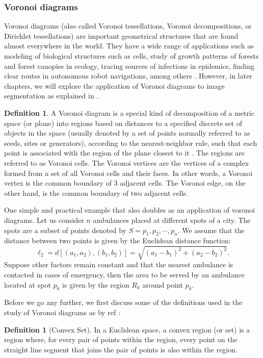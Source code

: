 \documentclass[10pt,a4paper]{article}
\theoremstyle{plain}
\theoremstyle{definition}
\newtheorem{defn}[subsection]{Definition}
\begin{document}
     \subsubsection{Voronoi diagrams }  
     Voronoi diagrams (also called Voronoi tessellations, Voronoi
     decompositions, or Dirichlet tessellations) are important geometrical structures that are found almost everywhere in the world. They have a wide range of applications such as modeling of biological structures such as cells, study of growth patterns of forests and forest canopies in ecology, tracing sources of infections in epidemics, finding clear routes in autonomous robot navigations, among others \citep{okabe2009spatial}. However, in later chapters, we will explore the application of Voronoi diagrams to image segmentation as explained in \citep{stoica2011delaunay}.\\
     \begin{defn}
     	A Voronoi diagram is a special kind of decomposition of a metric space (or plane) into regions based on distances to a specified discrete set of objects in the space (usually denoted by a
     	set of points normally referred to as seeds, sites or generators), according to the nearest-neighbor rule, such that each point is associated with the region of the plane closest to it \citep{aurenhammer2000voronoi}. The regions are referred to as Voronoi cells. The Voronoi vertices are the vertices of a complex formed from a set of all Voronoi cells and their faces. In other words, a Voronoi vertex is the common boundary of 3 adjacent cells. The Voronoi edge, on the other hand, is the common boundary of two adjacent cells.
     \end{defn}
     One simple and practical example that also doubles as an application of voronoi diagrams. Let us consider $n$ ambulances placed at different spots of a city. The spots are a subset of points denoted by $S = {p_1, p_2, \cdots, p_n}$. We assume that the distance between two points is given by the Euclidean distance function:
      \begin{equation}
      \ell_2 = d[(a_1,a_2),(b_1,b_2)] = \sqrt{(a_1 -b_1)^2 + (a_2 -b_2)^2}.
      \end{equation} Suppose other factors remain constant and that the nearest ambulance is contacted in cases of emergency, then the area to be served by an ambulance located at spot $p_k$ is given by the region $R_k$ around point $p_k$.
      
      Before we go any further, we first discuss some of the definitions used in the study of Voronoi diagrams as by ref \cite{aurenhammer2000voronoi}:
      \\
      \begin{defn}[Convex Set]
      	In a Euclidean space, a convex region (or set) is a region where, for every pair of points within the region, every point on the straight line segment that joins the pair of points is also within the region.\\
      \end{defn}
 
\end{document}
